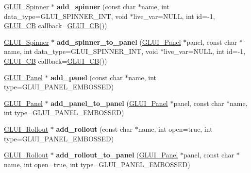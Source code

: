 \begin{DoxyCompactItemize}
\item 
\hypertarget{classGLUI_a1e804f1a12db884722ef68b8a0015aca}{\hyperlink{classGLUI__Spinner}{G\-L\-U\-I\-\_\-\-Spinner} $\ast$ {\bfseries add\-\_\-spinner} (const char $\ast$name, int data\-\_\-type=G\-L\-U\-I\-\_\-\-S\-P\-I\-N\-N\-E\-R\-\_\-\-I\-N\-T, void $\ast$live\-\_\-var=N\-U\-L\-L, int id=-\/1, \hyperlink{classGLUI__CB}{G\-L\-U\-I\-\_\-\-C\-B} callback=\hyperlink{classGLUI__CB}{G\-L\-U\-I\-\_\-\-C\-B}())}\label{classGLUI_a1e804f1a12db884722ef68b8a0015aca}

\item 
\hypertarget{classGLUI_a4d63e9951414f2db52433d8de233c5c5}{\hyperlink{classGLUI__Spinner}{G\-L\-U\-I\-\_\-\-Spinner} $\ast$ {\bfseries add\-\_\-spinner\-\_\-to\-\_\-panel} (\hyperlink{classGLUI__Panel}{G\-L\-U\-I\-\_\-\-Panel} $\ast$panel, const char $\ast$name, int data\-\_\-type=G\-L\-U\-I\-\_\-\-S\-P\-I\-N\-N\-E\-R\-\_\-\-I\-N\-T, void $\ast$live\-\_\-var=N\-U\-L\-L, int id=-\/1, \hyperlink{classGLUI__CB}{G\-L\-U\-I\-\_\-\-C\-B} callback=\hyperlink{classGLUI__CB}{G\-L\-U\-I\-\_\-\-C\-B}())}\label{classGLUI_a4d63e9951414f2db52433d8de233c5c5}

\item 
\hypertarget{classGLUI_a0fb30bda1f47cdf06d1fc86c4e7f6c65}{\hyperlink{classGLUI__Panel}{G\-L\-U\-I\-\_\-\-Panel} $\ast$ {\bfseries add\-\_\-panel} (const char $\ast$name, int type=G\-L\-U\-I\-\_\-\-P\-A\-N\-E\-L\-\_\-\-E\-M\-B\-O\-S\-S\-E\-D)}\label{classGLUI_a0fb30bda1f47cdf06d1fc86c4e7f6c65}

\item 
\hypertarget{classGLUI_ac9d7145a5aa4e3350a8895f0baa9469c}{\hyperlink{classGLUI__Panel}{G\-L\-U\-I\-\_\-\-Panel} $\ast$ {\bfseries add\-\_\-panel\-\_\-to\-\_\-panel} (\hyperlink{classGLUI__Panel}{G\-L\-U\-I\-\_\-\-Panel} $\ast$panel, const char $\ast$name, int type=G\-L\-U\-I\-\_\-\-P\-A\-N\-E\-L\-\_\-\-E\-M\-B\-O\-S\-S\-E\-D)}\label{classGLUI_ac9d7145a5aa4e3350a8895f0baa9469c}

\item 
\hypertarget{classGLUI_ace34224d7288138998f0176609210a45}{\hyperlink{classGLUI__Rollout}{G\-L\-U\-I\-\_\-\-Rollout} $\ast$ {\bfseries add\-\_\-rollout} (const char $\ast$name, int open=true, int type=G\-L\-U\-I\-\_\-\-P\-A\-N\-E\-L\-\_\-\-E\-M\-B\-O\-S\-S\-E\-D)}\label{classGLUI_ace34224d7288138998f0176609210a45}

\item 
\hypertarget{classGLUI_af54ce000a331eada19282db341312849}{\hyperlink{classGLUI__Rollout}{G\-L\-U\-I\-\_\-\-Rollout} $\ast$ {\bfseries add\-\_\-rollout\-\_\-to\-\_\-panel} (\hyperlink{classGLUI__Panel}{G\-L\-U\-I\-\_\-\-Panel} $\ast$panel, const char $\ast$name, int open=true, int type=G\-L\-U\-I\-\_\-\-P\-A\-N\-E\-L\-\_\-\-E\-M\-B\-O\-S\-S\-E\-D)}\label{classGLUI_af54ce000a331eada19282db341312849}


\end{DoxyCompactItemize}
